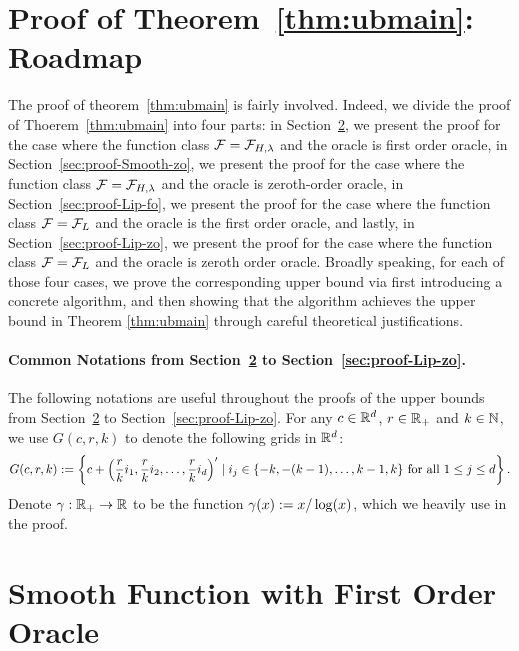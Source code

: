 \section{Proof of Theorem~\ref{thm:ubmain}: Roadmap}
\label{sec:ubmain-roadmap}
The proof of theorem~\ref{thm:ubmain} is fairly involved. Indeed, 
we divide the proof of Thoerem~\ref{thm:ubmain} into four parts: 
in Section~\ref{sec:proof-Smooth-fo}, we present the proof for the case 
where the function class $\mathcal{F} = \mathcal{F}_{H, \lambda}$ and the oracle is 
first order oracle, in Section~\ref{sec:proof-Smooth-zo}, we present the proof 
for the case where the function class $\mathcal{F} = \mathcal{F}_{H, \lambda}$ and the 
oracle is zeroth-order oracle, in Section~\ref{sec:proof-Lip-fo}, we present the 
proof for the case where the function class $\mathcal{F} = \mathcal{F}_L$ and the oracle is 
the first order oracle, and lastly, in Section~\ref{sec:proof-Lip-zo}, we present the 
proof for the case where the function class $\mathcal{F} = \mathcal{F}_L$ and the oracle 
is zeroth order oracle. Broadly speaking, for each of those four cases, we prove 
the corresponding upper bound via first introducing a concrete algorithm, and then 
showing that the algorithm achieves the upper bound in Theorem 
\ref{thm:ubmain} through careful theoretical justifications. 

\paragraph{Common Notations from Section~\ref{sec:proof-Smooth-fo} to
Section~\ref{sec:proof-Lip-zo}.} The following notations are useful throughout 
the proofs of the upper bounds from Section~\ref{sec:proof-Smooth-fo} to
Section~\ref{sec:proof-Lip-zo}. For any $c\in \mathbb{R}^d$, $r \in \mathbb{R}_+$ and $k \in \mathbb{N}$, 
we use $G(c, r, k)$ to denote the following grids in $\mathbb{R}^d$:
\begin{equation*}
G(c, r, k) := \left\{c + \left(\frac{r}{k}i_1, \frac{r}{k}i_2, \ldots, \frac{r}{k}i_d\right)^\prime 
	\mid i_j \in \{-k, -(k-1),\ldots, k-1, k\}~\text{for all}~1\leq j\leq d\right\}.
\end{equation*}
Denote $\gamma: \mathbb{R}_+ \to \mathbb{R}$ to be the function $\gamma(x) := x/\log(x)$, 
which we heavily use in the proof. 


\section{Smooth Function with First Order Oracle}
\label{sec:proof-Smooth-fo}
